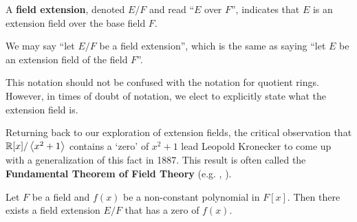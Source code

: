 \begin{definition}
    A \textbf{field extension}, denoted $E/F$ and read ``$E$ over $F$'', indicates that $E$ is an extension field over the base field $F$.
\end{definition}
\begin{remark}
    We may say ``let $E/F$ be a field extension'', which is the same as saying ``let $E$ be an extension field of the field $F$''.
\end{remark}
\begin{remark}
    This notation should not be confused with the notation for quotient rings. However, in times of doubt of notation, we elect to explicitly state what the extension field is.
\end{remark}

Returning back to our exploration of extension fields, the critical observation that $\mathbb{R}[x]/\left\langle x^2+1\right\rangle$ contains a `zero' of $x^2+1$ lead Leopold Kronecker to come up with a generalization of this fact in 1887. This result is often called the \textbf{Fundamental Theorem of Field Theory} (e.g. \cite[Theorem 20.1]{gallian_2016}, \cite[Theorem 21.5]{judson_beezer_2022}).
\begin{theorem}\label{thrm-fundamental-theorem-of-field-theory}
    Let $F$ be a field and $f(x)$ be a non-constant polynomial in $F[x]$. Then there exists a field extension $E/F$ that has a zero of $f(x)$.
\end{theorem}

